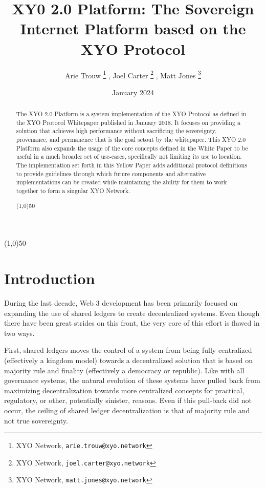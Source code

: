 \documentclass{article}
\title {XY0 2.0 Platform: The Sovereign Internet Platform based on the XYO Protocol}
\author{
    Arie Trouw
        \thanks{XYO Network, \texttt{arie.trouw@xyo.network}}
    , Joel Carter
        \thanks{XYO Network, \texttt{joel.carter@xyo.network}}
    , Matt Jones
        \thanks{XYO Network, \texttt{matt.jones@xyo.network}}
}
\date{January 2024}
\begin{document}
\pagecolor{yellow!25}
\maketitle

\begin{center}
    \line(1,0){50}
\end{center}

\begin{abstract}
    The XYO 2.0 Platform is a system implementation of the XYO Protocol as defined in the XYO Protocol Whitepaper published in January 2018.  It focuses on providing a solution that achieves high performance without sacrificing the sovereignty, provenance, and permanence that is the goal setout by the whitepaper.  This XYO 2.0 Platform also expands the usage of the core concepts defined in the White Paper to be useful in a much broader set of use-cases, specifically not limiting its use to location.  The implementation set forth in this Yellow Paper adds additional protocol definitions to provide guidelines through which future components and alternative implementations can be created while maintaining the ability for them to work together to form a singular XYO Network.
    \begin{center}
        \line(1,0){50}
    \end{center}
\end{abstract}

\section{Introduction}
During the last decade, Web 3 development has been primarily focused on expanding the use of shared ledgers to create decentralized systems.  Even though there have been great strides on this front, the very core of this effort is flawed in two ways.

First, shared ledgers moves the control of a system from being fully centralized (effectively a kingdom model) towards a decentralized solution that is based on majority rule and finality (effectively a democracy or republic).  Like with all governance systems, the natural evolution of these systems have pulled back from maximizing decentralization towards more centralized concepts for practical, regulatory, or other, potentially sinister, reasons.  Even if this pull-back did not occur, the ceiling of shared ledger decentralization is that of majority rule and not true sovereignty.
\end{document}
